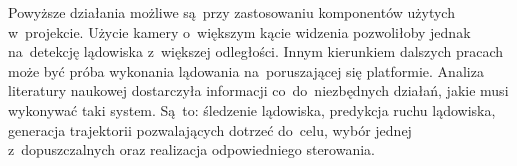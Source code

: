 Powyższe działania możliwe są~przy zastosowaniu komponentów użytych w~projekcie. 
Użycie kamery o~większym kącie widzenia pozwoliłoby jednak na~detekcję lądowiska z~większej odległości.
Innym kierunkiem dalszych pracach może być próba wykonania lądowania na~poruszającej się platformie. 
Analiza literatury naukowej dostarczyła informacji co~do~niezbędnych działań, jakie musi wykonywać taki system. 
Są~to: śledzenie lądowiska, predykcja ruchu lądowiska, generacja trajektorii pozwalających dotrzeć do~celu, wybór jednej z~dopuszczalnych oraz realizacja odpowiedniego sterowania.


